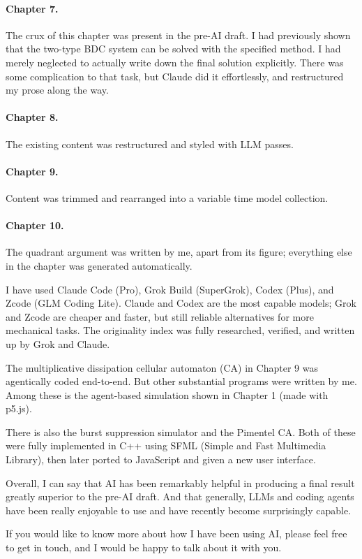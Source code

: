 \paragraph{Chapter 7.}
The crux of this chapter was present in the pre-AI draft. I had previously shown that the two-type BDC system can be solved with the specified method. I had merely neglected to actually write down the final solution explicitly. There was some complication to that task, but Claude did it effortlessly, and restructured my prose along the way.

\paragraph{Chapter 8.}
The existing content was restructured and styled with LLM passes.

\paragraph{Chapter 9.}
Content was trimmed and rearranged into a variable time model collection.

\paragraph{Chapter 10.}
The quadrant argument was written by me, apart from its figure; everything else in the chapter was generated automatically.

\medskip
I have used Claude Code (Pro), Grok Build (SuperGrok), Codex (Plus),  and Zcode (GLM Coding Lite). Claude and Codex are the most capable models; Grok and Zcode are cheaper and faster, but still reliable alternatives for more mechanical tasks. The originality index was fully researched, verified, and written up by Grok and Claude.

The multiplicative dissipation cellular automaton (CA) in Chapter 9 was agentically coded end-to-end. But other substantial programs were written by me. Among these is the agent-based simulation shown in Chapter 1 (made with p5.js).

There is also the burst suppression simulator and the Pimentel CA. Both of these were fully implemented in C++ using SFML (Simple and Fast Multimedia Library), then later ported to JavaScript and given a new user interface.

Overall, I can say that AI has been remarkably helpful in producing a final result greatly superior to the pre-AI draft. And that generally, LLMs and coding agents have been really enjoyable to use and have recently become surprisingly capable.

If you would like to know more about how I have been using AI, please feel free to get in touch, and I would be happy to talk about it with you.
\endgroup
